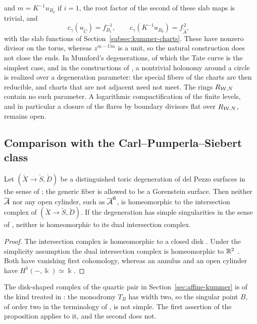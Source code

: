 \begin{remark}
and $m=K^{-1}u_{B_0}$ if $i=1$, the root factor of the second of these slab
maps is trivial, and
\[
 c_\gamma(u_{\widetilde C})=f_{B_1}^{-1},
 \qquad
 c_\gamma(K^{-1}u_{B_0})=f_{\widetilde A}^{\,2},
\]
with the slab functions of Section~\ref{subsec:kummer-charts}.  These have
nonzero divisor on the torus, whereas $z^{m-Um}$ is a unit, so the natural
construction does not close the ends.  In Mumford's degenerations, of which
the Tate curve is the simplest case, and in the constructions of
\cite{grosshackingkeel2015,grosssiebert2022}, a nontrivial holonomy around a
circle is realized over a degeneration parameter: the special fibers of the
charts are then reducible, and charts that are not adjacent need not meet.
The rings $R_{\mathcal W,N}$ contain no such parameter.  A logarithmic
compactification of the finite levels, and in particular a closure of the
flares by boundary divisors flat over $R_{\mathcal W,N}$, remains open.
\end{remark}

\subsection{Comparison with the Carl--Pumperla--Siebert class}

\begin{proposition}
\label{prop:no-CPS-degeneration}
Let $(\check X\to\check S,\check D)$ be a distinguished toric degeneration of del
Pezzo surfaces in the sense of \cite[Def.~7.1]{carletal2024}; the generic
fiber is allowed to be a Gorenstein surface.  Then neither $\overline{\mathcal A}$
nor any open cylinder, such as $\overline{\mathcal A}^{\mathrm{fl}}$, is
homeomorphic to the intersection complex of $(\check X\to\check S,\check D)$.  If
the degeneration has simple singularities in the sense of
\cite[Def.~1.60]{grosssiebert2006}, neither is homeomorphic to its dual
intersection complex.
\end{proposition}

\begin{proof}
The intersection complex is homeomorphic to a closed disk
\cite[Thm.~7.5 and Thm.~8.1]{carletal2024}.  Under the simplicity assumption the
dual intersection complex is homeomorphic to $\mathbb R^2$
\cite[Prop.~7.13]{carletal2024}.  Both have vanishing first cohomology,
whereas an annulus and an open cylinder have $H^1(-,\Bbbk)\simeq\Bbbk$.
\end{proof}

The disk-shaped complex of the quartic pair in
Section~\ref{sec:affine-kummer} is of the kind treated in
\cite[\S8.1]{carletal2024}: the monodromy $T_B$ has width two, so the
singular point $B$, of order two in the terminology of
\cite[\S8.1]{carletal2024}, is not simple.  The first assertion of the proposition
applies to it, and the second does not.

